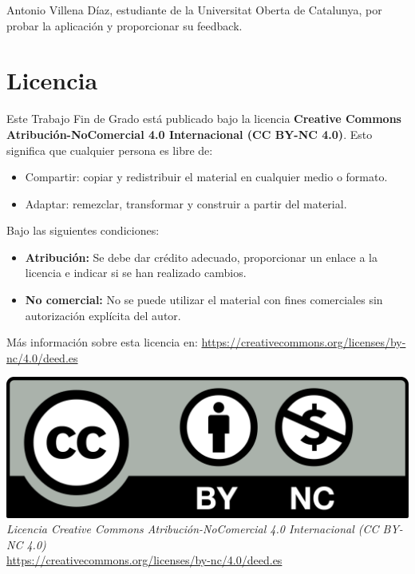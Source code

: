 Antonio Villena Díaz, estudiante de la Universitat Oberta de Catalunya, por probar la aplicación y proporcionar su feedback.


\chapter*{Licencia}

Este Trabajo Fin de Grado está publicado bajo la licencia \textbf{Creative Commons Atribución-NoComercial 4.0 Internacional (CC BY-NC 4.0)}.  
Esto significa que cualquier persona es libre de:

\begin{itemize}
	\item Compartir: copiar y redistribuir el material en cualquier medio o formato.
	\item Adaptar: remezclar, transformar y construir a partir del material.
\end{itemize}

Bajo las siguientes condiciones:

\begin{itemize}
	\item \textbf{Atribución:} Se debe dar crédito adecuado, proporcionar un enlace a la licencia e indicar si se han realizado cambios.
	\item \textbf{No comercial:} No se puede utilizar el material con fines comerciales sin autorización explícita del autor.
\end{itemize}

Más información sobre esta licencia en: \url{https://creativecommons.org/licenses/by-nc/4.0/deed.es}


\begin{center}
	\includegraphics[width=1\textwidth]{imagenes/licencia.png} \\
	\vspace{0.5em}
	\textit{Licencia Creative Commons Atribución-NoComercial 4.0 Internacional (CC BY-NC 4.0)} \\
	\url{https://creativecommons.org/licenses/by-nc/4.0/deed.es}
\end{center}
